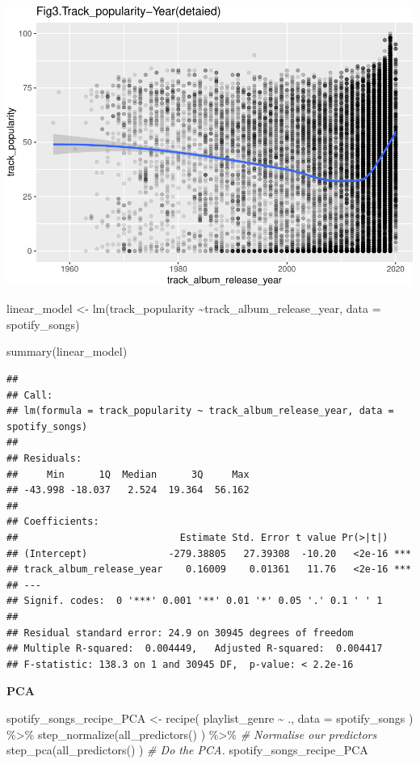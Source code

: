 \documentclass[
]{article}
\newenvironment{Shaded}{\begin{snugshade}}{\end{snugshade}}
\newcommand{\AttributeTok}[1]{\textcolor[rgb]{0.77,0.63,0.00}{#1}}
\newcommand{\CommentTok}[1]{\textcolor[rgb]{0.56,0.35,0.01}{\textit{#1}}}
\newcommand{\FunctionTok}[1]{\textcolor[rgb]{0.00,0.00,0.00}{#1}}
\newcommand{\NormalTok}[1]{#1}
\newcommand{\OtherTok}[1]{\textcolor[rgb]{0.56,0.35,0.01}{#1}}
\newcommand{\SpecialCharTok}[1]{\textcolor[rgb]{0.00,0.00,0.00}{#1}}
\begin{document}
\includegraphics{Final-Report_files/figure-latex/unnamed-chunk-17-1.pdf}

\begin{Shaded}
\begin{Highlighting}[]
\NormalTok{linear\_model }\OtherTok{\textless{}{-}} \FunctionTok{lm}\NormalTok{(track\_popularity }\SpecialCharTok{\textasciitilde{}}\NormalTok{track\_album\_release\_year, }
                   \AttributeTok{data =}\NormalTok{ spotify\_songs)}

\FunctionTok{summary}\NormalTok{(linear\_model)}
\end{Highlighting}
\end{Shaded}

\begin{verbatim}
## 
## Call:
## lm(formula = track_popularity ~ track_album_release_year, data = spotify_songs)
## 
## Residuals:
##     Min      1Q  Median      3Q     Max 
## -43.998 -18.037   2.524  19.364  56.162 
## 
## Coefficients:
##                            Estimate Std. Error t value Pr(>|t|)    
## (Intercept)              -279.38805   27.39308  -10.20   <2e-16 ***
## track_album_release_year    0.16009    0.01361   11.76   <2e-16 ***
## ---
## Signif. codes:  0 '***' 0.001 '**' 0.01 '*' 0.05 '.' 0.1 ' ' 1
## 
## Residual standard error: 24.9 on 30945 degrees of freedom
## Multiple R-squared:  0.004449,   Adjusted R-squared:  0.004417 
## F-statistic: 138.3 on 1 and 30945 DF,  p-value: < 2.2e-16
\end{verbatim}

\textbf{PCA}

\begin{Shaded}
\begin{Highlighting}[]
\NormalTok{spotify\_songs\_recipe\_PCA }\OtherTok{\textless{}{-}} \FunctionTok{recipe}\NormalTok{( playlist\_genre }\SpecialCharTok{\textasciitilde{}}\NormalTok{ ., }\AttributeTok{data =}\NormalTok{ spotify\_songs ) }\SpecialCharTok{\%\textgreater{}\%} 
  \FunctionTok{step\_normalize}\NormalTok{(}\FunctionTok{all\_predictors}\NormalTok{() ) }\SpecialCharTok{\%\textgreater{}\%} \CommentTok{\# Normalise our predictors }
  \FunctionTok{step\_pca}\NormalTok{(}\FunctionTok{all\_predictors}\NormalTok{() ) }\CommentTok{\# Do the PCA.}
\NormalTok{spotify\_songs\_recipe\_PCA}
\end{Highlighting}
\end{Shaded}
\end{document}
